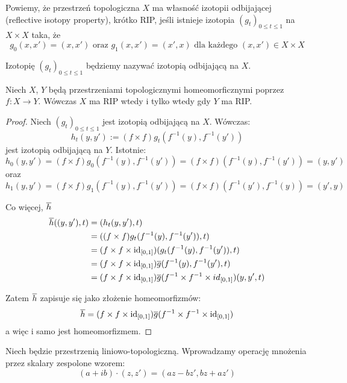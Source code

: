 \begin{df}
  Powiemy, że przestrzeń topologiczna $X$ ma własność izotopii odbijającej (reflective isotopy property), krótko RIP, jeśli istnieje izotopia $(g_t)_{0 \leq t \leq 1}$ na $X \times X$ taka, że
  \[g_0(x, x') = (x, x') \mbox{ oraz } g_1(x, x') = (x', x) \mbox{ dla każdego } (x, x') \in X \times X\]
  
  Izotopię $(g_t)_{0 \leq t \leq 1}$ będziemy nazywać izotopią odbijającą na $X$.
\end{df}

\begin{ex}
  Niech $X$, $Y$ będą przestrzeniami topologicznymi homeomorficznymi poprzez $f: X \rightarrow Y$. Wówczas $X$ ma RIP wtedy i tylko wtedy gdy $Y$ ma RIP.
  \begin{proof}
    Niech $(g_t)_{0 \leq t \leq 1}$ jest izotopią odbijającą na $X$. Wówczas:
    \[h_t(y, y') := (f \times f) g_t(f^{-1}(y), f^{-1}(y'))\]
    jest izotopią odbijającą na $Y$. Istotnie:
    \[h_0(y,y') = (f \times f) g_0(f^{-1}(y), f^{-1}(y')) = (f \times f)(f^{-1}(y), f^{-1}(y')) = (y, y')\]
    oraz
    \[h_1(y,y') = (f \times f) g_1(f^{-1}(y), f^{-1}(y')) = (f \times f)(f^{-1}(y'), f^{-1}(y)) = (y', y)\]
    
    Co więcej, $\overline{h}$ 
    \begin{align*}
      \overline{h}((y, y'), t) & = (h_t(y,y'), t) \\
      & = ((f \times f)g_t(f^{-1}(y), f^{-1}(y')), t) \\
      & = (f \times f \times \mbox{id}_{[0,1]}) (g_t(f^{-1}(y), f^{-1}(y')), t) \\
      & = (f \times f \times \mbox{id}_{[0,1]}) \overline{g} (f^{-1}(y), f^{-1}(y'), t) \\
      & = (f \times f \times \mbox{id}_{[0,1]}) \overline{g} (f^{-1} \times f^{-1} \times id_{[0,1]})(y, y', t) 
    \end{align*}
    
    Zatem $\overline{h}$ zapisuje się jako złożenie homeomorfizmów:
    \[\overline{h} = (f \times f \times \mbox{id}_{[0,1]}) \overline{g} (f^{-1} \times f^{-1} \times \mbox{id}_{[0,1]})\]
    a więc i samo jest homeomorfizmem.
  \end{proof}
\end{ex}

\begin{df}
  Niech będzie przestrzenią liniowo-topologiczną. Wprowadzamy operację mnożenia przez skalary zespolone wzorem:
  \[(a+ib) \cdot (z, z') = (az - bz', bz + az')\]
\end{df}


